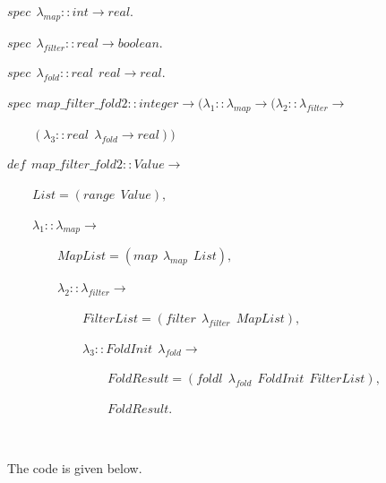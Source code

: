 \documentclass[
]{book}
\begin{document}
\begin{formulabox}
\(spec ~ ~ \lambda_{map} :: int \rightarrow real.\)

\(spec ~ ~ \lambda_{filter} :: real \rightarrow boolean.\)

\(spec ~ ~ \lambda_{fold} :: real ~ ~ real \rightarrow real.\)

\(spec ~ ~ map\_\mathit{f}ilter\_\mathit{f}old2 :: integer \rightarrow (\lambda_1 :: \lambda_{map} \rightarrow (\lambda_2 :: \lambda_{filter} \rightarrow\)

\(\quad \quad (\lambda_3 :: real ~ ~ \lambda_{fold} \rightarrow real))\)

\(de\mathit{f} ~ ~ map\_\mathit{f}ilter\_\mathit{f}old2 :: Value \rightarrow\)

\(\quad \quad List = (range ~ ~ Value),\)

\(\quad \quad \lambda_1 :: \lambda_{map} \rightarrow\)

\(\quad \quad \quad \quad MapList = (map ~ ~ \lambda_{map} ~ ~ List),\)

\(\quad \quad \quad \quad \lambda_2 :: \lambda_{filter} \rightarrow\)

\(\quad \quad \quad \quad \quad \quad FilterList = (filter ~ ~ \lambda_{filter} ~ ~ MapList),\)

\(\quad \quad \quad \quad \quad \quad \lambda_3 :: FoldInit ~ ~ \lambda_{fold} \rightarrow\)

\(\quad \quad \quad \quad \quad \quad \quad \quad FoldResult = (foldl ~ ~ \lambda_{fold} ~ ~ FoldInit ~ ~ FilterList),\)

\(\quad \quad \quad \quad \quad \quad \quad \quad FoldResult.\)

\end{formulabox}

\(\nonumber\)

The code is given below.
\end{document}
